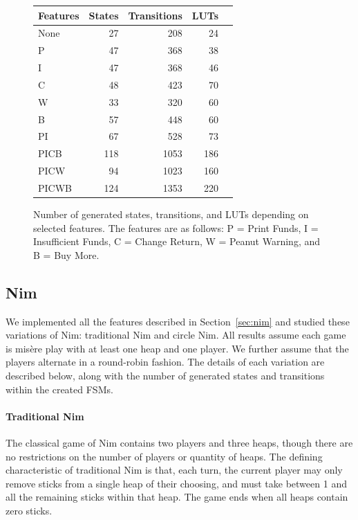 \documentclass[conference]{IEEEtran}
\begin{document}
\begin{figure}\small
    \centering
\begin{tabular}{lrrrr}\toprule
Features &States &Transitions &LUTs \\\midrule
None &27 &208 &24 \\
P &47 &368 &38 \\
I &47 &368 &46 \\
C &48 &423 &70 \\
W &33 &320 &60 \\
B &57 &448 &60 \\
PI &67 &528 &73 \\
PICB &118 &1053 &186 \\
PICW &94 &1023 &160 \\
PICWB &124 &1353 &220 \\
\bottomrule
\end{tabular}
    \caption{Number of generated states, transitions, and LUTs depending on selected features. The features are as follows: P = Print Funds, I = Insufficient Funds, C = Change Return, W = Peanut Warning, and B = Buy More.}
    \label{fig:vmData}
\end{figure}

\subsection{Nim}\label{sec:nimresults}

We implemented all the features described in Section~\ref{sec:nim} and studied these variations of Nim: traditional Nim and circle Nim. All results assume each game is mis\`{e}re play with at least one heap and one player. We further assume that the players alternate in a round-robin fashion. The details of each variation are described below, along with the number of generated states and transitions within the created FSMs. 

\paragraph{Traditional Nim}
The classical game of Nim contains two players and three heaps, though there are no restrictions on the number of players or quantity of heaps. The defining characteristic of traditional Nim is that, each turn, the current player may only remove sticks from a single heap of their choosing, and must take between 1 and all the remaining sticks within that heap. The game ends when all heaps contain zero sticks. 
\end{document}
